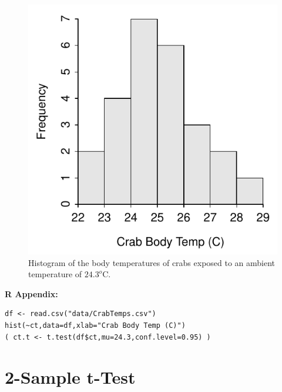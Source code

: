 \documentclass[10pt,openany]{book}\usepackage[]{graphicx}\usepackage[]{color}
\makeatletter
\newenvironment{kframe}{%
 \def\at@end@of@kframe{}%
 \ifinner\ifhmode%
  \def\at@end@of@kframe{\end{minipage}}%
  \begin{minipage}{\columnwidth}%
 \fi\fi%
 \def\FrameCommand##1{\hskip\@totalleftmargin \hskip-\fboxsep
 \colorbox{shadecolor}{##1}\hskip-\fboxsep
     \hskip-\linewidth \hskip-\@totalleftmargin \hskip\columnwidth}%
 \MakeFramed {\advance\hsize-\width
   \@totalleftmargin\z@ \linewidth\hsize
   \@setminipage}}%
 {\par\unskip\endMakeFramed%
 \at@end@of@kframe}
\newenvironment{knitrout}{}{} %
\makeatother
\begin{document}
\begin{knitrout}
\color{fgcolor}\begin{figure}[hbtp]

{\centering \includegraphics[width=.4\linewidth]{Figs/CrabTempHist-1} 

}

\caption[Histogram of the body temperatures of crabs exposed to an ambient temperature of $24.3^{o}$C]{Histogram of the body temperatures of crabs exposed to an ambient temperature of $24.3^{o}$C.}\label{fig:CrabTempHist}
\end{figure}


\end{knitrout}

\vspace*{-4pt}
\begin{minipage}{\textwidth}
\textbf{R Appendix:}
\vspace*{-6pt}
\begin{knitrout}
\color{fgcolor}\begin{kframe}
\begin{verbatim}
df <- read.csv("data/CrabTemps.csv")
hist(~ct,data=df,xlab="Crab Body Temp (C)")
( ct.t <- t.test(df$ct,mu=24.3,conf.level=0.95) )
\end{verbatim}
\end{kframe}
\end{knitrout}
\end{minipage}



\chapter{2-Sample t-Test} \label{chap:tTest2}

\vspace*{-12pt}
\minitoc
\vspace*{24pt}
\end{document}
